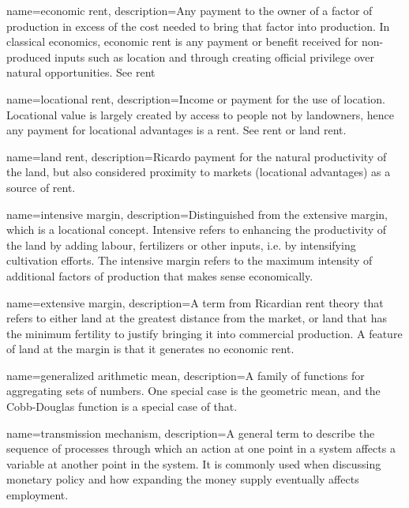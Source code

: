 {
name=economic rent,
description={Any payment to the owner of a factor of production in excess of the cost needed to bring that factor into production. In classical economics, economic rent is any payment or benefit received for non-produced inputs such as location and through creating official privilege over natural opportunities. See \gls{rent}}
}

{
name=locational rent,
description={Income or payment for the use of location. Locational value is largely created by access to people not by landowners, hence any payment for locational advantages is a rent. See \gls{rent} or \gls{land rent}.}
}

{
name=land rent,
description={Ricardo payment for  the natural productivity of the land, but also considered proximity to markets (locational advantages) as a source of rent. }
}

{
name=intensive margin,
description={Distinguished from the \gls{extensive margin}, which is a locational concept. Intensive refers to  enhancing the productivity of  the land by adding labour, fertilizers or other inputs, i.e. by intensifying cultivation efforts.  The intensive margin refers to the maximum intensity of additional factors of production that makes sense economically. }
}

{
name=extensive margin,
description={A term from Ricardian rent theory that refers to either land at the greatest distance from the market, or land that has the minimum fertility to justify bringing it into commercial production. A feature of land at the margin is that it generates no \gls{economic rent}.}
}

{
name=generalized arithmetic mean,
description={A family of functions for aggregating sets of numbers. One special case is the geometric mean,  and the Cobb-Douglas function is a special case of that.} %
}

{
name=transmission mechanism,
description={A general term to describe the sequence of processes through which an action at one point in a system  affects a variable at another point in the system. It is commonly used when discussing  monetary policy and how  expanding the money supply eventually affects employment.}
}

